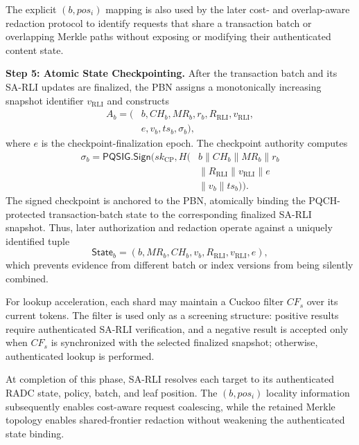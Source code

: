 \documentclass[lettersize,journal]{IEEEtran}
\begin{document}
The explicit $(b,pos_i)$ mapping is also used by the later
cost- and overlap-aware redaction protocol to identify requests that
share a transaction batch or overlapping Merkle paths without exposing
or modifying their authenticated content state.

\medskip
\noindent\textbf{Step 5: Atomic State Checkpointing.}
After the transaction batch and its SA-RLI updates are finalized, the
PBN assigns a monotonically increasing snapshot identifier
$v_{\mathrm{RLI}}$ and constructs
\begin{equation}
\begin{aligned}
A_b=\big(&b,CH_b,MR_b,r_b,R_{\mathrm{RLI}},
v_{\mathrm{RLI}},\\
& e,v_b,ts_b,\sigma_b\big),
\end{aligned}
\end{equation}
where $e$ is the checkpoint-finalization epoch. The checkpoint authority
computes
\begin{equation}
\begin{aligned}
\sigma_b=
\mathsf{PQSIG.Sign}\big(
sk_{\mathrm{CP}},
H(&b\parallel CH_b\parallel MR_b\parallel r_b\\
&\parallel R_{\mathrm{RLI}}\parallel v_{\mathrm{RLI}}
\parallel e\\
&\parallel v_b\parallel ts_b)\big).
\end{aligned}
\end{equation}
The signed checkpoint is anchored to the PBN, atomically binding the
PQCH-protected transaction-batch state to the corresponding finalized
SA-RLI snapshot. Thus, later authorization and redaction operate against
a uniquely identified tuple
\begin{equation}
\mathsf{State}_b=
(b,MR_b,CH_b,v_b,R_{\mathrm{RLI}},v_{\mathrm{RLI}},e),
\end{equation}
which prevents evidence from different batch or index versions from
being silently combined.

For lookup acceleration, each shard may maintain a Cuckoo filter
$CF_s$ over its current tokens. The filter is used only as a screening
structure: positive results require authenticated SA-RLI verification,
and a negative result is accepted only when $CF_s$ is synchronized with
the selected finalized snapshot; otherwise, authenticated lookup is
performed.

At completion of this phase, SA-RLI resolves each target to its
authenticated RADC state, policy, batch, and leaf position. The
$(b,pos_i)$ locality information subsequently enables cost-aware request
coalescing, while the retained Merkle topology enables shared-frontier
redaction without weakening the authenticated state binding.
    
\end{document}
